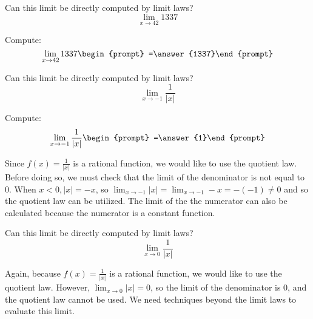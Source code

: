 \documentclass[handout]{ximera}
\begin{document}
\begin{exercise}
  Can this limit be directly computed by limit laws?
  \[
  \displaystyle\lim_{x\to 42} 1337
  \]
  \begin{multipleChoice}
  \end{multipleChoice}
\begin{question}
    Compute:
    \[
    \displaystyle\lim_{x\to 42} 1337 \begin{prompt} =\answer{1337}\end{prompt}
    \]
  \end{question}

\end{exercise}

\begin{exercise}
  Can this limit be directly computed by limit laws?
  \[
  \displaystyle\lim_{x\to -1} \frac{1}{|x|}
  \]
  \begin{multipleChoice}
  \end{multipleChoice}
  \begin{question}
    Compute:
    \[
    \displaystyle\lim_{x\to -1} \frac{1}{|x|} \begin{prompt} =\answer{1}\end{prompt}
    \]
    \begin{feedback}
      Since $f(x)=\frac{1}{|x|}$ is a rational function, we would like to use the quotient law.  Before doing so, we must check that the limit of the denominator is not equal to $0$.  When $x < 0, |x| = -x$, so $\displaystyle\lim_{x\to -1} |x| = \displaystyle\lim_{x\to -1} -x = -(-1) \neq 0$ and so the quotient law can be utilized. The limit of the the numerator can also be calculated because the numerator is a constant function.  
    \end{feedback}
  \end{question}
\end{exercise}

\begin{exercise}
  Can this limit be directly computed by limit laws?
  \[
  \displaystyle\lim_{x\to 0} \frac{1}{|x|}
  \]
  \begin{multipleChoice}
    
     \begin{feedback}
      Again, because $f(x)=\frac{1}{|x|}$ is a rational function, we would like to use the quotient law.  However, $\displaystyle\lim_{x\to 0} |x| = 0$, so the limit of the denominator is $0$, and the quotient law cannot be used.  We need techniques beyond the limit laws to evaluate this limit. 
    \end{feedback}
    
  \end{multipleChoice}
\end{exercise}
\end{document}
